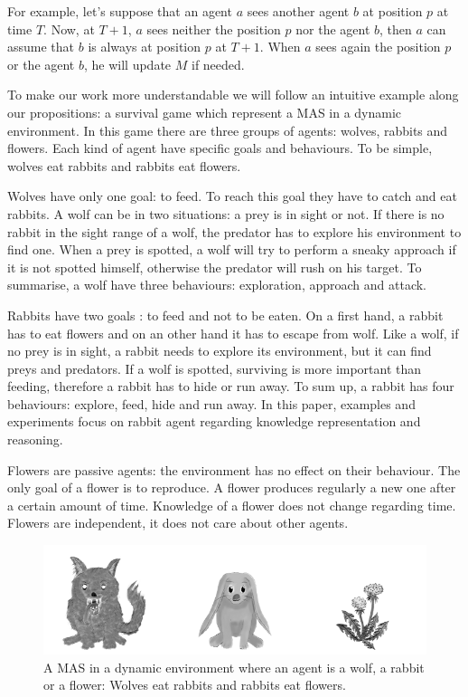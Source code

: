 \documentclass{aamas2012}
\begin{document}
	For example, let's suppose that an agent $a$ sees another agent $b$ at position $p$ at time $T$.
	Now, at $T+1$, $a$ sees neither the position $p$ nor the agent $b$, then $a$ can assume that $b$ is always at position $p$ at $T+1$.
	When $a$ sees again the position $p$ or the agent $b$, he will update $M$ if needed.
	
	To make our work more understandable we will follow an intuitive example along our propositions: a survival game which represent a MAS in a dynamic environment.
	In this game there are three groups of agents: wolves, rabbits and flowers.
	Each kind of agent have specific goals and behaviours.
	To be simple, wolves eat rabbits and rabbits eat flowers.
	
	Wolves have only one goal: to feed.
	To reach this goal they have to catch and eat rabbits.
	A wolf can be in two situations: a prey is in sight or not.
	If there is no rabbit in the sight range of a wolf, the predator has to explore his environment to find one.
	When a prey is spotted, a wolf will try to perform a sneaky approach if it is not spotted himself, otherwise the predator will rush on his target.
	To summarise, a wolf have three behaviours: exploration, approach and attack.
	
	Rabbits have two goals : to feed and not to be eaten.
	On a first hand, a rabbit has to eat flowers and on an other hand it has to escape from wolf.
	Like a wolf, if no prey is in sight, a rabbit needs to explore its environment, but it can find preys and predators.
	If a wolf is spotted, surviving is more important than feeding, therefore a rabbit has to hide or run away.
	To sum up, a rabbit has four behaviours: explore, feed, hide and run away.
	In this paper, examples and experiments focus on rabbit agent regarding knowledge representation and reasoning.
	
	Flowers are passive agents: the environment has no effect on their behaviour.
	The only goal of a flower is to reproduce.
	A flower produces regularly a new one after a certain amount of time.
	Knowledge of a flower does not change regarding time.
	Flowers are independent, it does not care about other agents.

	\begin{figure}
		\centering
		\includegraphics[keepaspectratio=true,scale=3.0]{food_chain.png}
		\caption
		{
			\label{food_chain}
			A MAS in a dynamic environment where an agent is a wolf, a rabbit or a flower:
			Wolves eat rabbits and rabbits eat flowers.
		}
	\end{figure}
\end{document}
